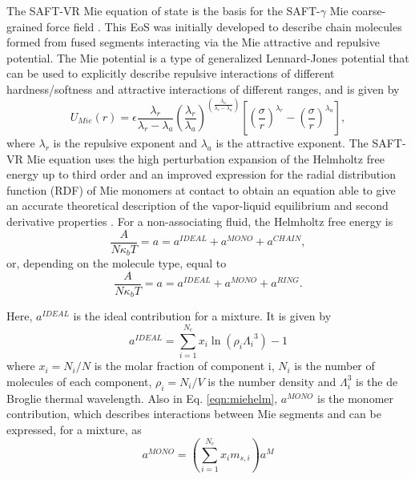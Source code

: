 	The SAFT-VR Mie equation of state \cite{lafitte2013} is the basis for the SAFT-$\gamma$ Mie coarse-grained force field \cite{avendano2011}. This EoS was initially developed to describe chain molecules formed from fused segments interacting via the Mie attractive and repulsive potential. The Mie potential is a type of generalized Lennard-Jones potential that can be used to explicitly describe repulsive interactions of different hardness/softness and attractive interactions of different ranges, and is given by
	\begin{equation}
	U_{Mie}(r) = \epsilon\frac{\lambda_r}{\lambda_r - \lambda_a} \left(\frac{\lambda_r}{\lambda_a} \right)^{\left( \frac{\lambda_a}{\lambda_r - \lambda_a} \right)}
	\left[ \left(\frac{\sigma}{r} \right)^{\lambda_r} - \left(\frac{\sigma}{r} \right)^{\lambda_a} \right],
	\label{eqn:miepotential}
	\end{equation}
	where $\lambda_r$ is the repulsive exponent and $\lambda_a$ is the attractive exponent. The SAFT-VR Mie equation uses the  high perturbation expansion of the Helmholtz free energy up to third order and an improved expression for the  radial distribution function (RDF) of Mie monomers at contact to obtain an equation able to give an accurate theoretical description of the vapor-liquid equilibrium and second derivative properties \cite{lafitte2013}. For a non-associating fluid, the Helmholtz free energy is
	\begin{equation}
	\frac{A}{N\kappa_{b}T} = a = a^{IDEAL} + a^{MONO} + a^{CHAIN}, 
	\label{eqn:miehelm}
	\end{equation}
    or, depending on the molecule type, equal to 
	\begin{equation}
	\frac{A}{N\kappa_{b}T} = a = a^{IDEAL} + a^{MONO} + a^{RING}.
	\label{eqn:miehelmring}
	\end{equation}
    
	Here, $a^{IDEAL}$ is the ideal contribution for a mixture. It is given by
	\begin{equation}
	a^{IDEAL} = \sum_{i=1}^{N_{c}} x_{i}\ln{(\rho_{i}{\Lambda_{i}}^3)} -1
	\label{eqn:aideal}
	\end{equation}
	where $x_{i}=N_{i}/N$ is the molar fraction of component i, $N_{i}$ is the number of molecules of each component, $\rho_{i}=N_{i}/V$ is the number density and $\Lambda_{i}^3$ is the de Broglie thermal wavelength. Also in Eq. \ref{eqn:miehelm}, $a^{MONO}$ is the monomer contribution, which  describes interactions between Mie segments and can be expressed, for a mixture, as
	\begin{equation}
	a^{MONO} = \left(\sum_{i=1}^{N_{c}} x_{i}m_{s,i} \right)a^{M}
	\label{eqn:amonomer}
	\end{equation}
	
